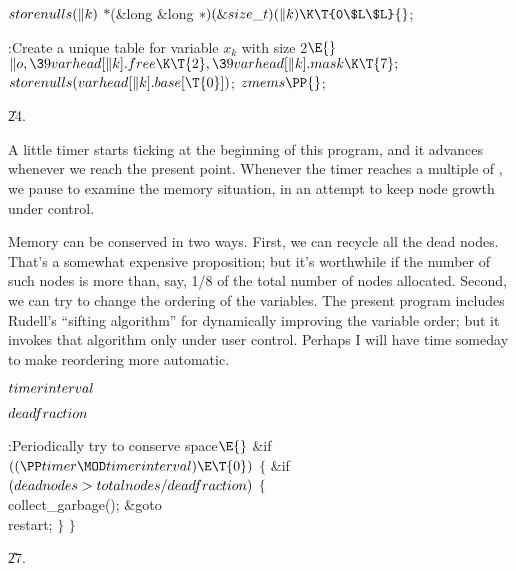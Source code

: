 \Y\B\4\D$\\{storenulls}(\|k)$ \5
${*}{}$(\&{long} \&{long} ${}{*})(\&{size\_t})(\|k)\K\T{0\$L\$L}{}$;\par
\Y\B\4:Create a unique table for variable $x_k$ with size 2\X${}\E{}$\6
$\|o,\39\\{varhead}[\|k].\\{free}\K\T{2},\39\\{varhead}[\|k].\\{mask}\K%
\T{7};{}$\6
${}\\{storenulls}(\\{varhead}[\|k].\\{base}[\T{0}]){}$;\6
${}\\{zmems}\PP{}$;\par
\U24.\fi

A little timer starts ticking at the beginning of this
program,
and it advances whenever we reach the present point.
Whenever the timer reaches a multiple of , we pause to
examine the memory situation, in an attempt to keep node growth under
control.

Memory can be conserved in two ways. First, we can recycle all the dead
nodes. That's a somewhat expensive proposition; but it's worthwhile
if the number of such nodes is more than, say, 1/8 of the total
number of nodes allocated. Second, we can try to change the ordering
of the variables. The present program includes Rudell's
``sifting algorithm'' for dynamically improving the variable order; but
it invokes that algorithm only under user control. Perhaps I will have
time someday to make reordering more automatic.

\Y\B\4\D$\\{timerinterval}$ \5
\par
\B\4\D$\\{deadfraction}$ \5
\par
\Y\B\4:Periodically try to conserve space\X${}\E{}$\6
\&{if} ${}((\PP\\{timer}\MOD\\{timerinterval})\E\T{0}){}$\5
${}\{{}$\1\6
\&{if} ${}(\\{deadnodes}>\\{totalnodes}/\\{deadfraction}){}$\5
${}\{{}$\1\6
\\{collect\_garbage}();\6
\&{goto} \\{restart};\6
\4${}\}{}$\2\6
\4${}\}{}$\2\par
\U27.\fi

